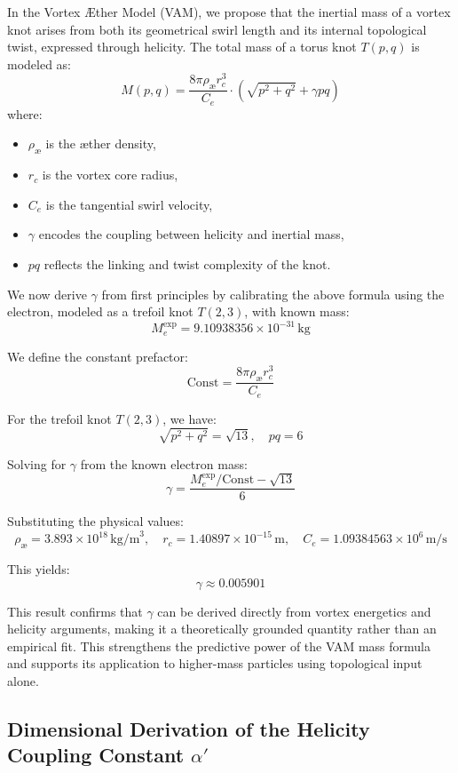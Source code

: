 \documentclass[a4paper, aps,preprint,superscriptaddress, 12pt]{revtex4}
\begin{document}
In the Vortex Æther Model (VAM), we propose that the inertial mass of a vortex knot arises from both its geometrical swirl length and its internal topological twist, expressed through helicity. The total mass of a torus knot \( T(p,q) \) is modeled as:
\[
    M(p,q) = \frac{8\pi \rho_\text{\ae} r_c^3}{C_e} \cdot \left( \sqrt{p^2 + q^2} + \gamma pq \right)
\]
where:
\begin{itemize}
    \item \( \rho_\text{\ae} \) is the æther density,
    \item \( r_c \) is the vortex core radius,
    \item \( C_e \) is the tangential swirl velocity,
    \item \( \gamma \) encodes the coupling between helicity and inertial mass,
    \item \( pq \) reflects the linking and twist complexity of the knot.
\end{itemize}

We now derive \( \gamma \) from first principles by calibrating the above formula using the electron, modeled as a trefoil knot \( T(2,3) \), with known mass:
\[
    M_e^{\text{exp}} = 9.10938356 \times 10^{-31} \, \text{kg}
\]

We define the constant prefactor:
\[
    \text{Const} = \frac{8\pi \rho_\text{\ae} r_c^3}{C_e}
\]

For the trefoil knot \( T(2,3) \), we have:
\[
    \sqrt{p^2 + q^2} = \sqrt{13}, \quad pq = 6
\]

Solving for \( \gamma \) from the known electron mass:
\[
    \gamma = \frac{M_e^{\text{exp}} / \text{Const} - \sqrt{13}}{6}
\]

Substituting the physical values:
\[
    \rho_\text{\ae} = 3.893 \times 10^{18} \, \text{kg/m}^3, \quad
    r_c = 1.40897 \times 10^{-15} \, \text{m}, \quad
    C_e = 1.09384563 \times 10^6 \, \text{m/s}
\]

This yields:
\[
    \boxed{\gamma \approx 0.005901}
\]

This result confirms that \( \gamma \) can be derived directly from vortex energetics and helicity arguments, making it a theoretically grounded quantity rather than an empirical fit. This strengthens the predictive power of the VAM mass formula and supports its application to higher-mass particles using topological input alone.

\subsection*{Dimensional Derivation of the Helicity Coupling Constant \( \alpha' \)}
\end{document}
